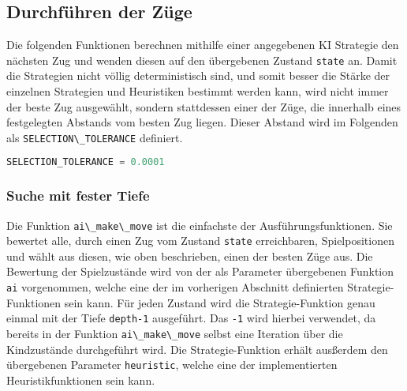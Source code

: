 \hypertarget{durchfuxfchren-der-zuxfcge}{%
\subsection{Durchführen der Züge}\label{durchfuxfchren-der-zuxfcge}}

Die folgenden Funktionen berechnen mithilfe einer angegebenen \ac{KI}
Strategie den nächsten Zug und wenden diesen auf den übergebenen Zustand
\passthrough{\lstinline!state!} an. Damit die Strategien nicht völlig
deterministisch sind, und somit besser die Stärke der einzelnen
Strategien und Heuristiken bestimmt werden kann, wird nicht immer der
beste Zug ausgewählt, sondern stattdessen einer der Züge, die innerhalb
eines festgelegten Abstands vom besten Zug liegen. Dieser Abstand wird
im Folgenden als \passthrough{\lstinline!SELECTION\_TOLERANCE!}
definiert.

\begin{lstlisting}[language=Python]
SELECTION_TOLERANCE = 0.0001
\end{lstlisting}

\hypertarget{suche-mit-fester-tiefe}{%
\subsubsection{Suche mit fester Tiefe}\label{suche-mit-fester-tiefe}}

Die Funktion \passthrough{\lstinline!ai\_make\_move!} ist die einfachste
der Ausführungsfunktionen. Sie bewertet alle, durch einen Zug vom
Zustand \passthrough{\lstinline!state!} erreichbaren, Spielpositionen
und wählt aus diesen, wie oben beschrieben, einen der besten Züge aus.
Die Bewertung der Spielzustände wird von der als Parameter übergebenen
Funktion \passthrough{\lstinline!ai!} vorgenommen, welche eine der im
vorherigen Abschnitt definierten Strategie-Funktionen sein kann. Für
jeden Zustand wird die Strategie-Funktion genau einmal mit der Tiefe
\passthrough{\lstinline!depth-1!} ausgeführt. Das
\passthrough{\lstinline!-1!} wird hierbei verwendet, da bereits in der
Funktion \passthrough{\lstinline!ai\_make\_move!} selbst eine Iteration
über die Kindzustände durchgeführt wird. Die Strategie-Funktion erhält
ausßerdem den übergebenen Parameter \passthrough{\lstinline!heuristic!},
welche eine der implementierten Heuristikfunktionen sein kann.

